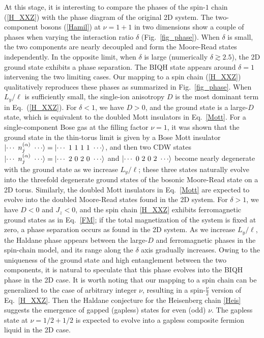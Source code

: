 \documentclass[aps,prb,twocolumn,superscriptaddress,showpacs,floatfix]{revtex4-1}
\begin{document}
At this stage, it is interesting to compare the phases of the spin-$1$ chain (\ref{H_XXZ})\cite{denNijs,KennedyTasaki,ChenHidaSanctuary} with the phase diagram of the original 2D system. 
The two-component bosons (\ref{Hamil}) at $\nu=1+1$ in two dimensions show a couple of phases when varying the interaction ratio $\delta$ (Fig.\ \ref{fig_phase}).\cite{RegnaultSenthil, FurukawaUeda2} When $\delta$ is small, the two components are nearly decoupled and form the Moore-Read states\cite{Cooper} independently. In the opposite limit, when $\delta$ is large (numerically $\delta\gtrsim2.5$), the 2D ground state exhibits a phase separation.  
The BIQH state appears around $\delta=1$ intervening the two limiting cases.\cite{FurukawaUeda, WuJain, RegnaultSenthil}  
Our mapping to a spin chain (\ref{H_XXZ}) qualitatively reproduces these phases as summarized in Fig.\ \ref{fig_phase}. 
When $L_y/\ell$ is sufficiently small, the single-ion anisotropy $D$ is the most dominant term in Eq.\ (\ref{H_XXZ}). 
For $\delta< 1$, we have $D>0$, and the ground state is a large-$D$ state, which is equivalent to the doubled Mott insulators in Eq.\ \eqref{Mott}. 
For a single-component Bose gas at the filling factor $\nu=1$, it was shown that the ground state in the thin-torus limit is given by a Bose Mott insulator $\ket{\cdots\ n_j^{(\alpha)}\ \cdots}=\ket{\cdots\ 1\ 1\ 1\ 1\ \cdots}$, and then two CDW states 
$\ket{\cdots\ n_j^{(\alpha)}\ \cdots}=\ket{\cdots\ 2\ 0\ 2\ 0\ \cdots}$ and $\ket{\cdots\ 0\ 2\ 0\ 2\ \cdots}$ become nearly degenerate with the ground state as we increase $L_y/\ell$; these three states naturally evolve into the threefold degenerate ground states of the bosonic Moore-Read state on a 2D torus.\cite{Wikberg} Similarly, the doubled Mott insulators in Eq.\ \eqref{Mott} are expected to evolve into the doubled Moore-Read states found in the 2D system. 
For $\delta>1$, we have $D<0$ and $J_z<0$, and the spin chain \eqref{H_XXZ} exhibits ferromagnetic ground states as in Eq.\ \eqref{FM}; if the total magnetization of the system is fixed at zero, a phase separation occurs as found in the 2D system. 
As we increase $L_y/\ell$, the Haldane phase appears between the large-$D$ and ferromagnetic phases in the spin-chain model, and its range along the $\delta$ axis gradually increases. 
Owing to the uniqueness of the ground state and high entanglement between the two components, it is natural to speculate that this phase evolves into the BIQH phase in the 2D case. 
It is worth noting that our mapping to a spin chain can be generalized to the case of arbitrary integer $\nu$, resulting in a spin-$\frac{\nu}{2}$ version of Eq.~\eqref{H_XXZ}. 
Then the Haldane conjecture for the Heisenberg chain \eqref{Heis} \cite{HaldanePhysLett, Haldane} suggests the emergence of gapped (gapless) states for even (odd) $\nu$. 
The gapless state at $\nu=1/2+1/2$ is expected to evolve into a gapless composite fermion liquid in the 2D case.\cite{WuJain2}
\end{document}
